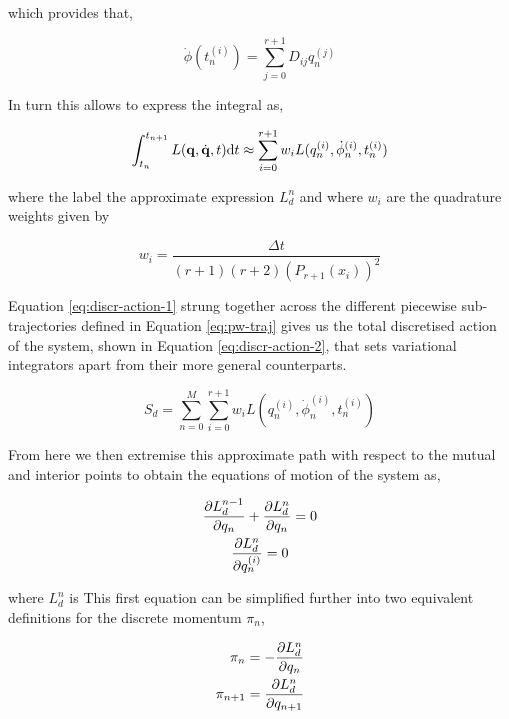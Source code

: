 \documentclass[10pt]{iopart}
\begin{document}
which provides that,

\begin{equation}
  \dot\phi(t_n^{(i)}) = \sum_{j = 0}^{r + 1} D_{ij}q_n^{(j)}
\end{equation}

In turn this allows to express the integral as,

\begin{equation}
\label{eq:discr-action-1}
  \int_{t_n}^{t_{n + 1}} L(\vb q, \dot{\vb q}, t) \dd t \approx \sum_{i = 0}^{r + 1} w_i L(q_{n}^{(i)}, \dot\phi_{n}^{(i)}, t_{n}^{(i)})
\end{equation}

where the label the approximate expression $L_d^n$ and where $w_i$ are the quadrature weights given by

\begin{equation}
  w_i = \frac{\Delta t}{(r + 1)(r + 2)(P_{r + 1}(x_i))^2}
\end{equation}

Equation \eqref{eq:discr-action-1} strung together across the different piecewise sub-trajectories defined in Equation \eqref{eq:pw-traj} gives us the total discretised action of the system, shown in Equation \eqref{eq:discr-action-2}, that sets variational integrators  apart from their  more general counterparts. 

\begin{equation}
\label{eq:discr-action-2}
  S_d = \sum_{n = 0}^{M} \sum_{i = 0}^{r + 1} w_i L(q_{n}^{(i)}, \dot\phi_{n}^{(i)}, t_{n}^{(i)})
\end{equation}

From here we then extremise this approximate path with respect to the mutual and interior  points to obtain the equations of motion of the system as,

\begin{gather}
	\frac{\partial L_d^{n-1}}{\partial q_n} + \frac{\partial L_d^{n}}{\partial q_n} = 0 \\
	\label{eq:Ld-interior-eom} \frac{\partial L_d^{n}}{\partial q^{(i)}_n} = 0
\end{gather}

where $L_d^{n}$ is This first equation can be simplified further into two equivalent definitions for the discrete momentum \(\pi_n\),

\begin{align}
	\label{eq:pi-n} \pi_n &= -\frac{\partial L_d^{n}}{\partial q_n} \\
	\label{eq:pi-n+1} \pi_{n + 1} &= \frac{\partial L_d^{n}}{\partial q_{n + 1}}
\end{align}
\end{document}
